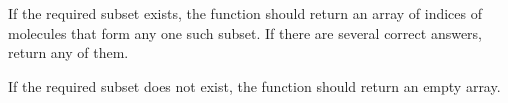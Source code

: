 If the required subset exists, the function should return an array of indices of molecules that form any one such subset. If there are several correct answers, return any of them.

If the required subset does not exist, the function should return an empty array.